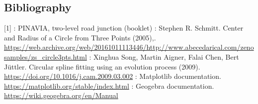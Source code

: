 \documentclass[a4paper,12pt,fleqn]{article}
\begin{document}



\newpage
\begin{appendices}
\section{Bibliography}
\label{app:a}
[1] : PINAVIA, two-level road junction (booklet)
\newline
[2] :  Stephen R. Schmitt. Center and Radius of a Circle from Three Points (2005),.  \url{https://web.archive.org/web/20161011113446/http://www.abecedarical.com/zenosamples/zs_circle3pts.html}
\newline
[3] : Xinghua Song, Martin Aigner, Falai Chen, Bert Jüttler. Circular spline fitting using an evolution process (2009). \url{https://doi.org/10.1016/j.cam.2009.03.002}
\newline
[4] : Matplotlib documentation. \url{https://matplotlib.org/stable/index.html}
\newline
[5] : Geogebra documentation. \url{https://wiki.geogebra.org/en/Manual}
 
\end{appendices}
\end{document}

